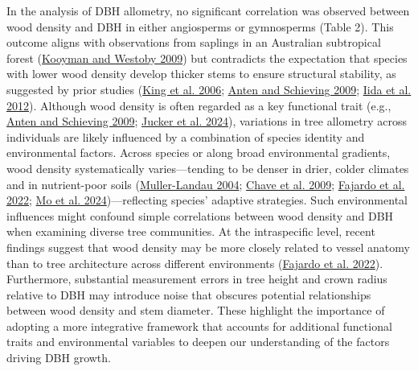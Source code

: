\documentclass[
  12pt,
  letterpaper,
  DIV=11,
  numbers=noendperiod]{scrartcl}
\begin{document}
In the analysis of DBH allometry, no significant correlation was
observed between wood density and DBH in either angiosperms or
gymnosperms (Table 2). This outcome aligns with observations from
saplings in an Australian subtropical forest
(\protect\hyperlink{ref-Kooyman2009}{Kooyman and Westoby 2009}) but
contradicts the expectation that species with lower wood density develop
thicker stems to ensure structural stability, as suggested by prior
studies (\protect\hyperlink{ref-King2006}{King et al. 2006};
\protect\hyperlink{ref-Anten2009}{Anten and Schieving 2009};
\protect\hyperlink{ref-Iida2012}{Iida et al. 2012}). Although wood
density is often regarded as a key functional trait (e.g.,
\protect\hyperlink{ref-Anten2009}{Anten and Schieving 2009};
\protect\hyperlink{ref-Jucker2024}{Jucker et al. 2024}), variations in
tree allometry across individuals are likely influenced by a combination
of species identity and environmental factors. Across species or along
broad environmental gradients, wood density systematically
varies---tending to be denser in drier, colder climates and in
nutrient-poor soils
(\protect\hyperlink{ref-Muller-Landau2004}{Muller-Landau 2004};
\protect\hyperlink{ref-Chave2009}{Chave et al. 2009};
\protect\hyperlink{ref-Fajardo2022b}{Fajardo et al. 2022};
\protect\hyperlink{ref-Mo2024}{Mo et al. 2024})---reflecting species'
adaptive strategies. Such environmental influences might confound simple
correlations between wood density and DBH when examining diverse tree
communities. At the intraspecific level, recent findings suggest that
wood density may be more closely related to vessel anatomy than to tree
architecture across different environments
(\protect\hyperlink{ref-Fajardo2022b}{Fajardo et al. 2022}).
Furthermore, substantial measurement errors in tree height and crown
radius relative to DBH may introduce noise that obscures potential
relationships between wood density and stem diameter. These highlight
the importance of adopting a more integrative framework that accounts
for additional functional traits and environmental variables to deepen
our understanding of the factors driving DBH growth.
\end{document}
